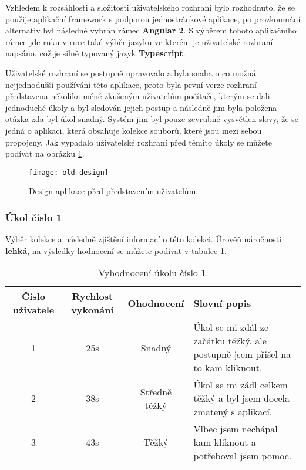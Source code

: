 \par Vzhledem k rozsáhlosti a složitosti uživatelského rozhraní bylo rozhodnuto, že se použije aplikační framework s podporou jednostránkové aplikace, po prozkoumání alternativ byl následně vybrán rámec \textbf{Angular 2}. S výběrem tohoto aplikačního rámce jde ruku v ruce také výběr jazyku ve kterém je uživatelské rozhraní napsáno, což je silně typovaný jazyk \textbf{Typescript}.

\par Uživatelské rozhraní se postupně upravovalo a byla snaha o co možná nejjednodušší používání této aplikace, proto byla první verze rozhraní představena několika méně zkušeným uživatelům počítače, kterým se dali jednoduché úkoly a byl sledován jejich postup a následně jim byla položena otázka zda byl úkol snadný. Systém jim byl pouze zevrubně vysvětlen slovy, že se jedná o aplikaci, která obsahuje kolekce souborů, které jsou mezi sebou propojeny. Jak vypadalo uživatelské rozhraní před těmito úkoly se můžete podívat na obrázku \ref{old-ui}.

\begin{figure}[!h]
\centering
\texttt{[image: old-design]}
\caption{Design aplikace před představením uživatelům.}
\label{old-ui}
\end{figure}

\subsubsection{Úkol číslo 1} Výběr kolekce a následně zjištění informací o této kolekci. Úrověň náročnosti \textbf{lehká}, na výsledky hodnocení se můžete podívat v tabulce \ref{ukol-1}.
\begin{table}[htp]
\begin{center}
\begin{tabular}{ || c || c | c | m{5cm} || }
\hline
Číslo uživatele & Rychlost vykonání & Ohodnocení & Slovní popis \\ [0.5ex]
\hline
\hline
1 & 25s & Snadný & Úkol se mi zdál ze začátku těžký, ale postupně jsem přišel na to kam kliknout. \\
\hline
2 & 38s & Středně těžký & Úkol se mi zádl celkem těžký a byl jsem docela zmatený s aplikací. \\
\hline
3 & 43s & Těžký & Vlbec jsem nechápal kam kliknout a potřeboval jsem pomoc. \\
\hline
\end{tabular}
\end{center}
\caption{Vyhodnocení úkolu číslo 1.}
\label{ukol-1}
\end{table}
